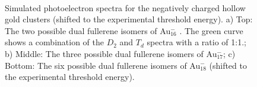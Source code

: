 \begin{figure}[htbp]
\begin{center}
    \hfill
    \\
\caption{Simulated photoelectron spectra for the negatively charged hollow gold clusters 
(shifted to the experimental threshold energy). a) Top: The two possible
dual fullerene isomers of Au$_{16}^-$ . The green curve shows a combination of the $D_2$ and $T_d$ spectra with a ratio of 1:1.; b) Middle: The three possible dual fullerene isomers of Au$_{17}^-$; c) Bottom:
The six possible dual fullerene isomers of Au$_{18}^-$ (shifted to the experimental threshold energy).}
  \label{fig:photo_Au16}
\end{center}
\end{figure}

